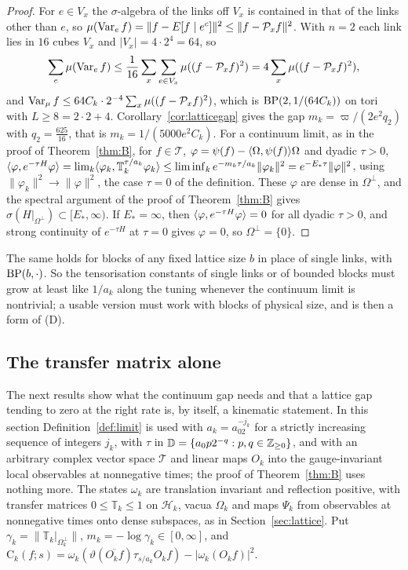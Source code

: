 \begin{proof}
For $e\in V_x$ the $\sigma$-algebra of the links off $V_x$ is contained in that
of the links other than $e$, so $\mu(\operatorname{Var}_ef)=\|f-E[f\mid e^c]\|^2\le\|f-
\mathcal P_xf\|^2$. With $n=2$ each link lies in $16$ cubes $V_x$ and $|V_x|=4
\cdot2^4=64$, so
\[
\sum_e\mu(\operatorname{Var}_ef)\le\frac1{16}\sum_x\sum_{e\in V_x}\mu((f-\mathcal P_xf)^2)=4
\sum_x\mu((f-\mathcal P_xf)^2),
\]
and $\operatorname{Var}_\mu f\le64C_k\cdot2^{-4}\sum_x\mu((f-\mathcal P_xf)^2)$, which is
$\mathrm{BP}(2,1/(64C_k))$ on tori with $L\ge8=2\cdot2+4$. Corollary~\ref{cor:latticegap}
gives the gap $m_k=\varpi/(2e^2q_2)$ with $q_2=\frac{625}{16}$, that is $m_k=1/
(5000e^2C_k)$. For a continuum limit, as in the proof of Theorem~\ref{thm:B},
for $f\in\mathcal T$, $\varphi=\psi(f)-\langle \Omega,\psi(f)\rangle\Omega$ and dyadic
$\tau>0$, $\langle \varphi,e^{-\tau H}\varphi\rangle=\lim_k\langle \varphi_k,\mathbb T_k^{\tau/
a_k}\varphi_k\rangle\le\liminf_ke^{-m_k\tau/a_k}\|\varphi_k\|^2=e^{-E_*\tau}\|\varphi
\|^2$, using $\|\varphi_k\|^2\to\|\varphi\|^2$, the case $\tau=0$ of the
definition. These $\varphi$ are dense in $\Omega^\perp$, and the spectral
argument of the proof of Theorem~\ref{thm:B} gives $\sigma(H|_{\Omega^\perp})
\subset[E_*,\infty)$. If $E_*=\infty$, then $\langle \varphi,e^{-\tau H}\varphi\rangle=0$
for all dyadic $\tau>0$, and strong continuity of $e^{-\tau H}$ at $\tau=0$
gives $\varphi=0$, so $\Omega^\perp=\{0\}$.
\end{proof}

The same holds for blocks of any fixed lattice size $b$ in place of single
links, with $\mathrm{BP}(b,\cdot)$. So the tensorisation constants of single links or of
bounded blocks must grow at least like $1/a_k$ along the tuning whenever the
continuum limit is nontrivial; a usable version must work with blocks of
physical size, and is then a form of (D).

\subsection{The transfer matrix alone}\label{ssec:transfer}

The next results show what the continuum gap needs and that a lattice gap
tending to zero at the right rate is, by itself, a kinematic statement. In this
section Definition~\ref{def:limit} is used with $a_k=a_02^{-j_k}$ for a strictly
increasing sequence of integers $j_k$, with $\tau$ in $\mathbb D=\{a_0p2^{-q}:
p,q\in\mathbb{Z}_{\ge0}\}$, and with an arbitrary complex vector space $\mathcal T$ and
linear maps $O_k$ into the gauge-invariant local observables at nonnegative
times; the proof of Theorem~\ref{thm:B} uses nothing more. The states
$\omega_k$ are translation invariant and reflection positive, with transfer
matrices $0\le\mathbb T_k\le1$ on $\mathcal H_k$, vacua $\Omega_k$ and maps
$\Psi_k$ from observables at nonnegative times onto dense subspaces, as in
Section~\ref{sec:lattice}. Put $\gamma_k=\|\mathbb T_k|_{\Omega_k^\perp}\|$,
$m_k=-\log\gamma_k\in[0,\infty]$, and $\mathrm C_k(f;s)=\omega_k(\vartheta(
\overline{O_kf})\tau_{s/a_k}O_kf)-|\omega_k(O_kf)|^2$.

